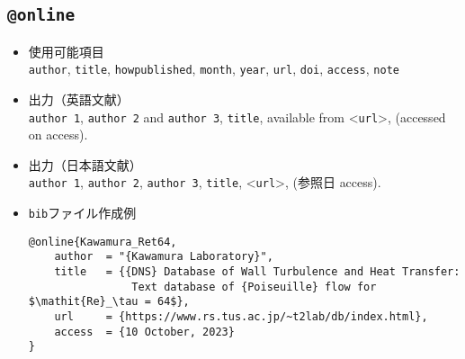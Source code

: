 \documentclass[a4paper,fleqn,uplatex,dvipdfmx]{jsarticle}
\makeatletter
\newcommand{\ttonline}{\texttt{@online}}
\makeatother
\begin{document}
\subsection{\ttonline}
\label{ssec:online}
\begin{screen}
    \begin{itemize}
        \item 使用可能項目 \\
        \verb|author|, \verb|title|, \verb|howpublished|, \verb|month|, \verb|year|, \verb|url|, \verb|doi|, \verb|access|, \verb|note|
        \item 出力（英語文献） \\
            \colorbox[gray]{0.8}{\texttt{author 1}}, \colorbox[gray]{0.8}{\texttt{author 2}} and \colorbox[gray]{0.8}{\texttt{author 3}}, \colorbox[gray]{0.8}{\texttt{title}}, available from \textless\colorbox[gray]{0.8}{\texttt{url}}\textgreater, (accessed on \colorbox[gray]{0.8}{access}).
        \item 出力（日本語文献） \\
            \colorbox[gray]{0.8}{\texttt{author 1}}, \colorbox[gray]{0.8}{\texttt{author 2}}, \colorbox[gray]{0.8}{\texttt{author 3}}, \colorbox[gray]{0.8}{\texttt{title}}, \textless\colorbox[gray]{0.8}{\texttt{url}}\textgreater, (参照日 \colorbox[gray]{0.8}{access}).
        \item \verb|bib|ファイル作成例 \vspace{-3mm}
\begin{verbatim}
@online{Kawamura_Ret64,
    author  = "{Kawamura Laboratory}",
    title   = {{DNS} Database of Wall Turbulence and Heat Transfer: 
                Text database of {Poiseuille} flow for $\mathit{Re}_\tau = 64$},
    url     = {https://www.rs.tus.ac.jp/~t2lab/db/index.html},
    access  = {10 October, 2023}
}
\end{verbatim}
    \end{itemize}
\end{screen}
\end{document}
